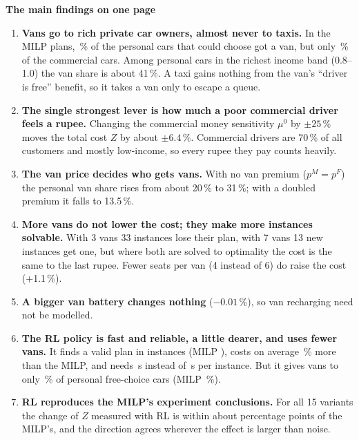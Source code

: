 \documentclass[11pt,a4paper]{article}
\renewcommand{\_}{\origunderscore\allowbreak}
\begin{document}
\begin{keybox}
\textbf{The main findings on one page}
\begin{enumerate}[leftmargin=*]
  \item \textbf{Vans go to rich private car owners, almost never to taxis.} In the MILP plans, \fvanPersMilp\,\% of the personal cars that could choose got a van, but only \fvanComMilp\,\% of the commercial cars. Among personal cars in the richest income band (0.8--1.0) the van share is about 41\,\%. A taxi gains nothing from the van's ``driver is free'' benefit, so it takes a van only to escape a queue.
  \item \textbf{The single strongest lever is how much a poor commercial driver feels a rupee.} Changing the commercial money sensitivity $\mu^0$ by $\pm25$\,\% moves the total cost $Z$ by about $\pm6.4$\,\%. Commercial drivers are 70\,\% of all customers and mostly low-income, so every rupee they pay counts heavily.
  \item \textbf{The van price decides who gets vans.} With no van premium ($p^M=p^F$) the personal van share rises from about 20\,\% to 31\,\%; with a doubled premium it falls to 13.5\,\%.
  \item \textbf{More vans do not lower the cost; they make more instances solvable.} With 3 vans 33 instances lose their plan, with 7 vans 13 new instances get one, but where both are solved to optimality the cost is the same to the last rupee. Fewer seats per van (4 instead of 6) do raise the cost (+1.1\,\%).
  \item \textbf{A bigger van battery changes nothing} ($-0.01$\,\%), so van recharging need not be modelled.
  \item \textbf{The RL policy is fast and reliable, a little dearer, and uses fewer vans.} It finds a valid plan in \frlValid{} instances (MILP \fmilpValid), costs on average \frlGapMean\,\% more than the MILP, and needs \frlSolveMean\,s instead of \fmilpSolveMean\,s per instance. But it gives vans to only \fvanPersRl\,\% of personal free-choice cars (MILP \fvanPersMilp\,\%).
  \item \textbf{RL reproduces the MILP's experiment conclusions.} For all 15 variants the change of $Z$ measured with RL is within about \fagreeRtMean{} percentage points of the MILP's, and the direction agrees wherever the effect is larger than noise.
\end{enumerate}
\end{keybox}

\tableofcontents
\newpage
\end{document}
